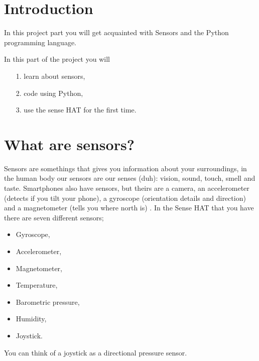 \documentclass{article}
\begin{document}
\section{Introduction}
\noindent In this project part you will get acquainted with Sensors and the Python programming language.

\noindent In this part of the project you will
\begin{itemize}
\item[1.] learn about sensors,
\item[2.] code using Python,
\item[3.] use the sense HAT for the first time.
\end{itemize}

\section{What are sensors?}
Sensors are somethings that gives you information about your surroundings, in the human body our sensors are our senses (duh): vision, sound, touch, smell and taste. Smartphones also have sensors, but theirs are a camera, an accelerometer (detects if you tilt your phone), a gyroscope (orientation details and direction) and a magnetometer (tells you where north is) \cite{foss}. In the Sense HAT that you have there are seven different sensors;
\begin{itemize}
    \item Gyroscope,
    \item Accelerometer,
    \item Magnetometer,
    \item Temperature,
    \item Barometric pressure,
    \item Humidity,
    \item Joystick.
\end{itemize}
You can think of a joystick as a directional pressure sensor.
\end{document}
